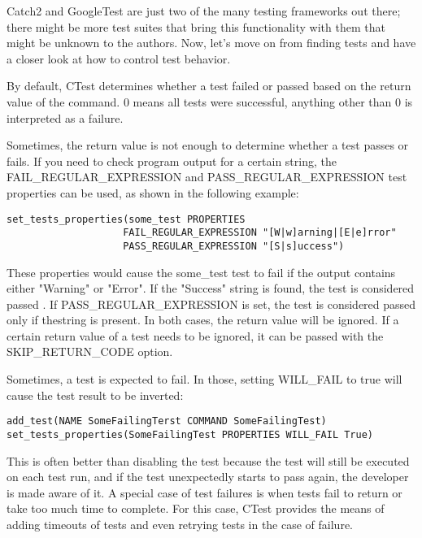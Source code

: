 Catch2 and GoogleTest are just two of the many testing frameworks out there; there might be more test suites that bring this functionality with them that might be unknown to the authors. Now, let's move on from finding tests and have a closer look at how to control test behavior.

 
By default, CTest determines whether a test failed or passed based on the return value of the command. 0 means all tests were successful, anything other than 0 is interpreted as a failure.

Sometimes, the return value is not enough to determine whether a test passes or fails. If you need to check program output for a certain string, the FAIL\_REGULAR\_EXPRESSION and PASS\_REGULAR\_EXPRESSION test properties can be used,  as shown in the following example:

\begin{lstlisting}[style=styleCMake]
set_tests_properties(some_test PROPERTIES
					FAIL_REGULAR_EXPRESSION "[W|w]arning|[E|e]rror"
					PASS_REGULAR_EXPRESSION "[S|s]uccess")
\end{lstlisting}

These properties would cause the some\_test test to fail if the output contains either "Warning" or "Error". If the "Success" string is found, the test is considered passed . If PASS\_REGULAR\_EXPRESSION is set, the test is considered passed only if thestring is present. In both cases, the return value will be ignored. If a certain return value of a test needs to be ignored, it can be passed with the SKIP\_RETURN\_CODE option.

Sometimes, a test is expected to fail. In those, setting WILL\_FAIL to true will cause the test result to be inverted:

\begin{lstlisting}[style=styleCMake]
add_test(NAME SomeFailingTerst COMMAND SomeFailingTest)
set_tests_properties(SomeFailingTest PROPERTIES WILL_FAIL True)
\end{lstlisting}

This is often better than disabling the test because the test will still be executed on each test run, and if the test unexpectedly starts to pass again, the developer is made aware of it. A special case of test failures is when tests fail to return or take too much time to complete. For this case, CTest provides the means of adding timeouts of tests and even retrying tests in the case of failure.

